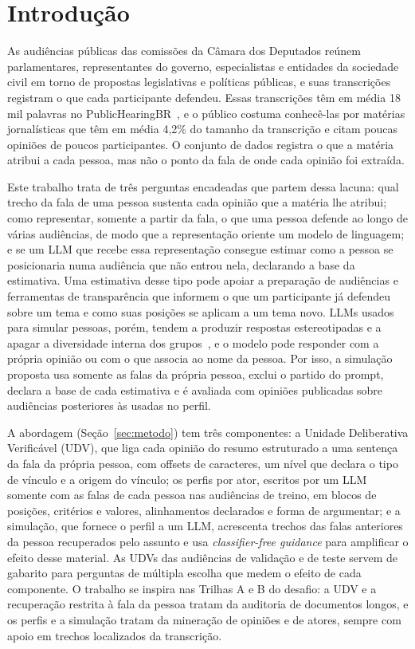 \section{Introdu\c{c}\~ao}
\label{sec:introducao}

As audiências públicas das comissões da Câmara dos Deputados reúnem parlamentares, representantes
do governo, especialistas e entidades da sociedade civil em torno de propostas legislativas e
políticas públicas, e suas transcrições registram o que cada participante defendeu. Essas
transcrições têm em média 18 mil palavras no PublicHearingBR~\citep{fernandes2024publichearingbr}, e o
público costuma conhecê-las por matérias jornalísticas que têm em média 4,2\% do tamanho da
transcrição e citam poucas opiniões de poucos participantes. O conjunto de dados registra o que a
matéria atribui a cada pessoa, mas não o ponto da fala de onde cada opinião foi extraída.

Este trabalho trata de três perguntas encadeadas que partem dessa lacuna: qual trecho da fala de uma
pessoa sustenta cada opinião que a matéria lhe atribui; como representar, somente a partir da fala,
o que uma pessoa defende ao longo de várias audiências, de modo que a representação oriente um
modelo de linguagem; e se um LLM que recebe essa representação consegue estimar como a pessoa se
posicionaria numa audiência que não entrou nela, declarando a base da estimativa. Uma estimativa
desse tipo pode apoiar a preparação de audiências e ferramentas de transparência que informem o que
um participante já defendeu sobre um tema e como suas posições se aplicam a um tema novo. LLMs usados
para simular pessoas, porém, tendem a produzir respostas estereotipadas e a apagar a diversidade
interna dos grupos~\citep{bisbee2024synthetic,wang2025large}, e o modelo pode responder com a própria
opinião ou com o que associa ao nome da pessoa. Por isso, a simulação proposta usa somente as falas
da própria pessoa, exclui o partido do prompt, declara a base de cada estimativa e é avaliada com
opiniões publicadas sobre audiências posteriores às usadas no perfil.

A abordagem (Seção~\ref{sec:metodo}) tem três componentes: a Unidade Deliberativa Verificável (UDV),
que liga cada opinião do resumo estruturado a uma sentença da fala da própria pessoa, com offsets de
caracteres, um nível que declara o tipo de vínculo e a origem do vínculo; os perfis por ator, escritos
por um LLM somente com as falas de cada pessoa nas audiências de treino, em blocos de posições,
critérios e valores, alinhamentos declarados e forma de argumentar; e a simulação, que fornece o
perfil a um LLM, acrescenta trechos das falas anteriores da pessoa recuperados pelo assunto e usa
\textit{classifier-free guidance} para amplificar o efeito desse material. As UDVs das audiências de
validação e de teste servem de gabarito para perguntas de múltipla escolha que medem o efeito de cada
componente. O trabalho se inspira nas Trilhas A e B do desafio: a UDV e a recuperação restrita à fala
da pessoa tratam da auditoria de documentos longos, e os perfis e a simulação tratam da mineração de
opiniões e de atores, sempre com apoio em trechos localizados da transcrição.


